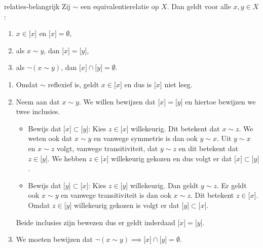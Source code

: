 \begin{lemma}{}{relaties-belangrijk}
    Zij $\sim$ een equivalentierelatie op $X$.
    Dan geldt voor alle $x,y \in X$:
    \begin{enumerate}[label = (\alph*)]
        \item $x \in \lbrack x \rbrack \,\, \text{en}\,\, \lbrack x \rbrack = \emptyset$,
        \item als $x \sim y$, dan $\lbrack x \rbrack = \lbrack y \rbrack$,
        \item als $\neg(x \sim y)$, dan $\lbrack x \rbrack \cap \lbrack y \rbrack = \emptyset$.
    \end{enumerate}
\end{lemma}
\begin{bewijs}{}{}
    \begin{enumerate}[label = (\alph*)]
        \item Omdat $\sim$ reflexief is, geldt $x \in \lbrack x \rbrack$ en dus is $\lbrack x \rbrack$ niet leeg.
        \item Neem aan dat $x \sim y$.
            We willen bewijzen dat $\lbrack x \rbrack = \lbrack y \rbrack$ en hiertoe bewijzen we twee inclusies.
            \begin{itemize}
                \item Bewijs dat $\lbrack x \rbrack \subset \lbrack y \rbrack$: Kies $z \in \lbrack x \rbrack$ willekeurig.
                    Dit betekent dat $x \sim z$.
                    We weten ook dat $x \sim y$ en vanwege symmetrie is dan ook $y \sim x$.
                    Uit $y \sim x$ en $x \sim z$ volgt, vanwege transitiviteit, dat $y \sim z$ en dit betekent dat $z \in \lbrack y \rbrack$.
                    We hebben $z \in \lbrack x \rbrack$ willekeurig gekozen en dus volgt er dat $\lbrack x \rbrack \subset \lbrack y \rbrack$.
                \item Bewijs dat $\lbrack y \rbrack \subset \lbrack x \rbrack$: Kies $z \in \lbrack y \rbrack$ willekeurig.
                    Dan geldt $y \sim z$.
                    Er geldt ook $x \sim y$ en vanwege transitiviteit is dan ook $x \sim z$.
                    Dit betekent $z \in \lbrack x \rbrack$.
                    Omdat $z \in \lbrack y \rbrack$ willekeurig gekozen is volgt er dat $\lbrack y \rbrack \subset \lbrack x \rbrack$.
            \end{itemize}
            Beide inclusies zijn bewezen dus er geldt inderdaad $\lbrack x \rbrack = \lbrack y \rbrack$.
        \item We moeten bewijzen dat $\neg(x \sim y) \implies \lbrack x \rbrack \cap \lbrack y \rbrack = \emptyset$.

\end{enumerate}
\end{bewijs}

